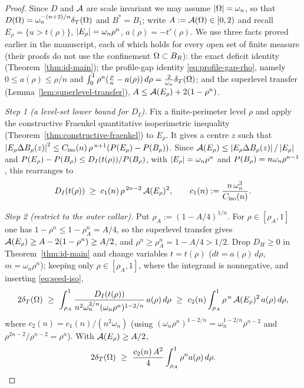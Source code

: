 \begin{proof}
Since $D$ and $\mathcal A$ are scale invariant we may assume $\left|\Omega\right|=\omega_n$, so
that $D(\Omega)=\omega_n^{-(n+2)/n}\delta_T(\Omega)$ and $B^*=B_1$; write $A:=\mathcal A(\Omega)\in
[0,2)$ and recall $E_\rho=\{u>t(\rho)\}$, $\left|E_\rho\right|=\omega_n\rho^n$,
$a(\rho)=-t'(\rho)$. We use three facts proved earlier in the manuscript,
each of which holds for every open set of finite measure (their proofs do not
use the confinement $\Omega\subset B_R$): the exact deficit identity
(Theorem~\ref{thm:id-main}); the profile-gap identity
\eqref{eq:profile-gap-rho}, namely $0\le a(\rho)\le\rho/n$ and
$\int_0^1\rho^n(\tfrac\rho n-a(\rho))\,d\rho=\tfrac2{\omega_n}\delta_T(\Omega)$; and
the superlevel transfer (Lemma~\ref{lem:superlevel-transfer}),
$A\le\mathcal A(E_\rho)+2(1-\rho^n)$.

\emph{Step 1 (a level-set lower bound for $D_I$).}
Fix a finite-perimeter level $\rho$ and apply the constructive Fraenkel
quantitative isoperimetric inequality (Theorem~\ref{thm:constructive-fraenkel})
to $E_\rho$.  It gives a centre $z$ such that
$\left|E_\rho\Delta B_\rho(z)\right|^2\le C_{\rm iso}(n)\,\rho^{\,n+1}
(P(E_\rho)-P(B_\rho))$. Since
$\mathcal A(E_\rho)\le\left|E_\rho\Delta B_\rho(z)\right|/\left|E_\rho\right|$ and
$P(E_\rho)-P(B_\rho)\le D_I(t(\rho))/P(B_\rho)$, with
$\left|E_\rho\right|=\omega_n\rho^n$ and $P(B_\rho)=n\omega_n\rho^{n-1}$, this
rearranges to
\begin{equation}\label{eq:seed-iso}
   D_I(t(\rho))\;\ge\;c_1(n)\,\rho^{\,2n-2}\,\mathcal A(E_\rho)^2,
   \qquad c_1(n):=\frac{n\,\omega_n^{3}}{C_{\rm iso}(n)} .
\end{equation}

\emph{Step 2 (restrict to the outer collar).}
Put $\rho_A:=(1-A/4)^{1/n}$. For $\rho\in[\rho_A,1]$ one has
$1-\rho^n\le1-\rho_A^n=A/4$, so the superlevel transfer gives
$\mathcal A(E_\rho)\ge A-2(1-\rho^n)\ge A/2$, and $\rho^n\ge\rho_A^n=1-A/4>1/2$.
Drop $D_H\ge0$ in Theorem~\ref{thm:id-main} and change variables
$t=t(\rho)$ ($dt=a(\rho)\,d\rho$, $m=\omega_n\rho^n$); keeping only
$\rho\in[\rho_A,1]$, where the integrand is nonnegative, and inserting
\eqref{eq:seed-iso},
\[
   2\dT(\Om)\ \ge\
   \int_{\rho_A}^1\frac{D_I(t(\rho))}{n^2\omega_n^{2/n}(\omega_n\rho^n)^{1-2/n}}
       \,a(\rho)\,d\rho
   \ \ge\ c_2(n)\int_{\rho_A}^1\rho^{\,n}\,\Fr(E_\rho)^2\,a(\rho)\,d\rho,
\]
where $c_2(n)=c_1(n)/(n^2\omega_n)$ (using
$(\omega_n\rho^n)^{1-2/n}=\omega_n^{1-2/n}\rho^{n-2}$ and
$\rho^{2n-2}/\rho^{n-2}=\rho^n$). With $\mathcal A(E_\rho)\ge A/2$,
\begin{equation}\label{eq:seed-collar}
   2\delta_T(\Omega)\ \ge\ \frac{c_2(n)\,A^2}{4}\int_{\rho_A}^1\rho^n a(\rho)\,d\rho .
\end{equation}


\end{proof}
